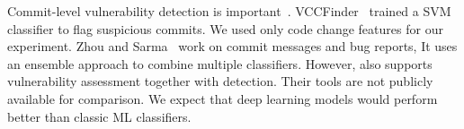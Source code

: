 

\vspace{3pt}
Commit-level vulnerability detection is
important~\cite{perl2015vccfinder,zhou2017automated,chen2019large}.
VCCFinder~\cite{perl2015vccfinder} trained a SVM classifier to flag
suspicious commits. We used only code change features for our
experiment. Zhou and Sarma~\cite{zhou2017automated} work on commit
messages and bug reports, It uses an ensemble approach to combine
multiple classifiers.
However, {\tool} also supports vulnerability assessment together with
detection. Their tools are not publicly available for comparison. We
expect that deep learning models would perform better than classic ML
classifiers.


